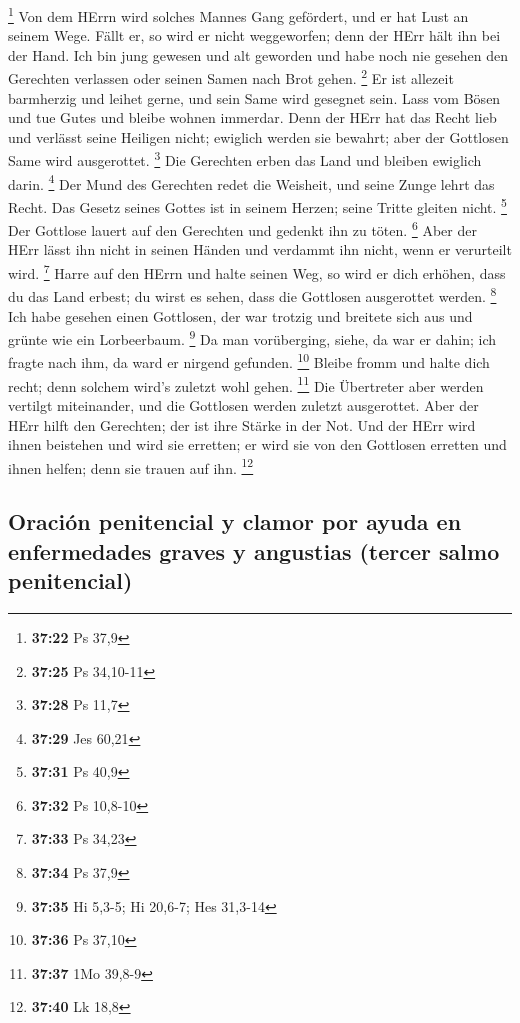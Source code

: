 \footnote{\textbf{37:22} Ps 37,9}  Von dem HErrn wird
solches Mannes Gang gefördert, und er hat Lust an seinem Wege.
 Fällt er, so wird er nicht weggeworfen; denn der HErr
hält ihn bei der Hand.  Ich bin jung gewesen und alt
geworden und habe noch nie gesehen den Gerechten verlassen oder seinen
Samen nach Brot gehen. \footnote{\textbf{37:25} Ps 34,10-11}
 Er ist allezeit barmherzig und leihet gerne, und sein
Same wird gesegnet sein.  Lass vom Bösen und tue Gutes
und bleibe wohnen immerdar.  Denn der HErr hat das Recht
lieb und verlässt seine Heiligen nicht; ewiglich werden sie bewahrt;
aber der Gottlosen Same wird ausgerottet. \footnote{\textbf{37:28} Ps
  11,7}  Die Gerechten erben das Land und bleiben
ewiglich darin. \footnote{\textbf{37:29} Jes 60,21}  Der
Mund des Gerechten redet die Weisheit, und seine Zunge lehrt das Recht.
 Das Gesetz seines Gottes ist in seinem Herzen; seine
Tritte gleiten nicht. \footnote{\textbf{37:31} Ps 40,9} 
Der Gottlose lauert auf den Gerechten und gedenkt ihn zu töten.
\footnote{\textbf{37:32} Ps 10,8-10}  Aber der HErr lässt
ihn nicht in seinen Händen und verdammt ihn nicht, wenn er verurteilt
wird. \footnote{\textbf{37:33} Ps 34,23}  Harre auf den
HErrn und halte seinen Weg, so wird er dich erhöhen, dass du das Land
erbest; du wirst es sehen, dass die Gottlosen ausgerottet werden.
\footnote{\textbf{37:34} Ps 37,9}  Ich habe gesehen einen
Gottlosen, der war trotzig und breitete sich aus und grünte wie ein
Lorbeerbaum. \footnote{\textbf{37:35} Hi 5,3-5; Hi 20,6-7; Hes 31,3-14}
 Da man vorüberging, siehe, da war er dahin; ich fragte
nach ihm, da ward er nirgend gefunden. \footnote{\textbf{37:36} Ps 37,10}
 Bleibe fromm und halte dich recht; denn solchem wird's
zuletzt wohl gehen. \footnote{\textbf{37:37} 1Mo 39,8-9} 
Die Übertreter aber werden vertilgt miteinander, und die Gottlosen
werden zuletzt ausgerottet.  Aber der HErr hilft den
Gerechten; der ist ihre Stärke in der Not.  Und der HErr
wird ihnen beistehen und wird sie erretten; er wird sie von den
Gottlosen erretten und ihnen helfen; denn sie trauen auf ihn.
\footnote{\textbf{37:40} Lk 18,8}

\hypertarget{oraciuxf3n-penitencial-y-clamor-por-ayuda-en-enfermedades-graves-y-angustias-tercer-salmo-penitencial}{%
\subsection{Oración penitencial y clamor por ayuda en enfermedades
graves y angustias (tercer salmo
penitencial)}\label{oraciuxf3n-penitencial-y-clamor-por-ayuda-en-enfermedades-graves-y-angustias-tercer-salmo-penitencial}}

